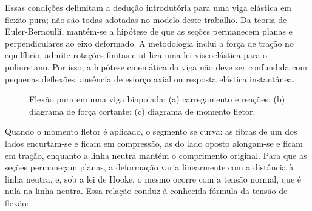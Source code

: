 \documentclass[arial,centeredequations,english,brazilian,oneside,section=TITLE]{ifes8}
\begin{document}
Essas condições delimitam a dedução introdutória para uma viga elástica em flexão pura;
não são todas adotadas no modelo deste trabalho. Da teoria de Euler-Bernoulli,
mantém-se a hipótese de que as seções permanecem planas e perpendiculares ao eixo
deformado. A metodologia inclui a força de tração no equilíbrio, admite rotações
finitas e utiliza uma lei viscoelástica para o poliuretano. Por isso, a hipótese
cinemática da viga não deve ser confundida com pequenas deflexões, ausência de
esforço axial ou resposta elástica instantânea.

\begin{figure}[h]
  \centering
  \caption{Flexão pura em uma viga biapoiada: (a) carregamento e reações;
    (b) diagrama de força cortante; (c) diagrama de momento fletor.}
  \label{fig:flexao-pura}
\end{figure}

Quando o momento fletor é aplicado, o segmento se curva: as fibras de um dos lados
encurtam-se e ficam em compressão, as do lado oposto alongam-se e ficam em tração,
enquanto a linha neutra mantém o comprimento original. Para que as seções
permaneçam planas, a deformação varia linearmente com a distância à linha neutra, e,
sob a lei de Hooke, o mesmo ocorre com a tensão normal, que é nula na linha neutra.
Essa relação conduz à conhecida fórmula da tensão de
flexão:
\end{document}
